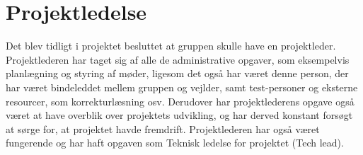 \section{Projektledelse}

Det blev tidligt i projektet besluttet at gruppen skulle have en projektleder. Projektlederen har taget sig af alle de administrative opgaver, som eksempelvis planlægning og styring af møder, ligesom det også har været denne person, der har været bindeleddet mellem gruppen og vejlder, samt test-personer og eksterne resourcer, som korrekturlæsning osv. Derudover har projektlederens opgave også været at have overblik over projektets udvikling, og har derved konstant forsøgt at sørge for, at projektet havde fremdrift. Projektlederen har også været fungerende og har haft opgaven som Teknisk ledelse for projektet (Tech lead).